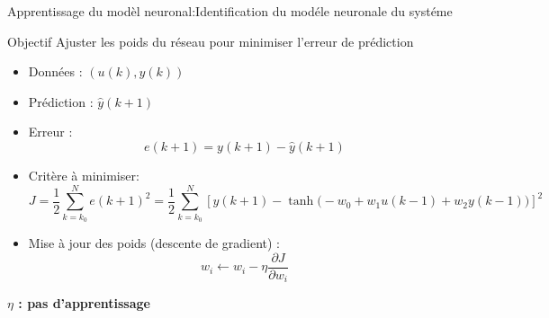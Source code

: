 \documentclass[aspectratio=169,12pt]{beamer}
\begin{document}
	\begin{frame}{\color{red}Apprentissage du modèl neuronal:Identification du modéle neuronale du systéme}
		\begin{alertblock}{Objectif}
			Ajuster les poids du réseau pour minimiser l’erreur de prédiction
		\end{alertblock}
		\vspace{4pt}
		\begin{itemize}
			\item Données : $(u(k), y(k))$
			\item Prédiction : $\hat{y}(k+1)$
			\item Erreur :
			\[
			e(k+1) = y(k+1) - \hat{y}(k+1)
			\]
			\item Critère à minimiser:
			\[
			J = \frac{1}{2}\sum_{k = k_0}^{N} e(k+1)^2 =\frac{1}{2}\sum_{k = k_0}^{N}
			\left[y(k+1)-\tanh\big(-w_0 + w_1 u(k-1) + w_2 y(k-1)\big)
			\right]^2
			\]
		\end{itemize}	
	\end{frame}
	\begin{frame}
		\begin{itemize}
			\item Mise à jour des poids (descente de gradient) :
			\[
			w_i \leftarrow w_i - \eta \frac{\partial J}{\partial w_i}
			\]
		\end{itemize}
		\textbf{\color{green} $\eta$ : pas d'apprentissage}
	\end{frame}
\end{document}
